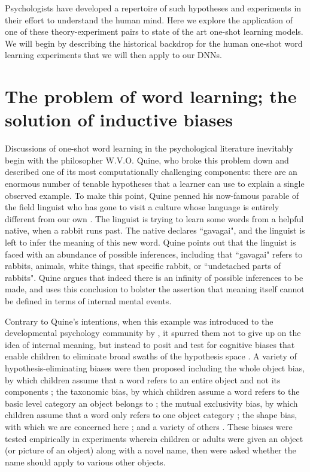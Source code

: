 \documentclass{article}
\begin{document}
Psychologists have developed a repertoire of such hypotheses and experiments in their effort to understand the human mind. Here we explore the application of one of these theory-experiment pairs to state of the art one-shot learning models. We will begin by describing the historical backdrop for the human one-shot word learning experiments that we will then apply to our DNNs.


\section{The problem of word learning; the solution of inductive biases}

Discussions of one-shot word learning in the psychological literature inevitably begin with the philosopher W.V.O. Quine, who broke this problem down and described one of its most computationally challenging components: there are an enormous number of tenable hypotheses that a learner can use to explain a single observed example. To make this point, Quine penned his now-famous parable of the field linguist who has gone to visit a culture whose language is entirely different from our own \citep{quine2013word}. The linguist is trying to learn some words from a helpful native, when a rabbit runs past. The native declares ``gavagai", and the linguist is left to infer the meaning of this new word. Quine points out that the linguist is faced with an abundance of possible inferences, including that ``gavagai" refers to rabbits, animals, white things, that specific rabbit, or ``undetached parts of rabbits". Quine argues that indeed there is an infinity of possible inferences to be made, and uses this conclusion to bolster the assertion that meaning itself cannot be defined in terms of internal mental events\footnotemark.

Contrary to Quine's intentions, when this example was introduced to the developmental psychology community by \citet{macnamara1972cognitive}, it spurred them not to give up on the idea of internal meaning, but instead to posit and test for cognitive biases that enable children to eliminate broad swaths of the hypothesis space \citep{bloom2000children}. A variety of hypothesis-eliminating biases were then proposed including the whole object bias, by which children assume that a word refers to an entire object and not its components \citep{markman1990constraints}; the taxonomic bias, by which children assume a word refers to the basic level category an object belongs to \citep{markman1984children}; the mutual exclusivity bias, by which children assume that a word only refers to one object category \citep{markman1988children}; the shape bias, with which we are concerned here \citep{landau1988importance}; and a variety of others \citep{bloom2000children}. These biases were tested empirically in experiments wherein children or adults were given an object (or picture of an object) along with a novel name, then were asked whether the name should apply to various other objects. 
\end{document}
